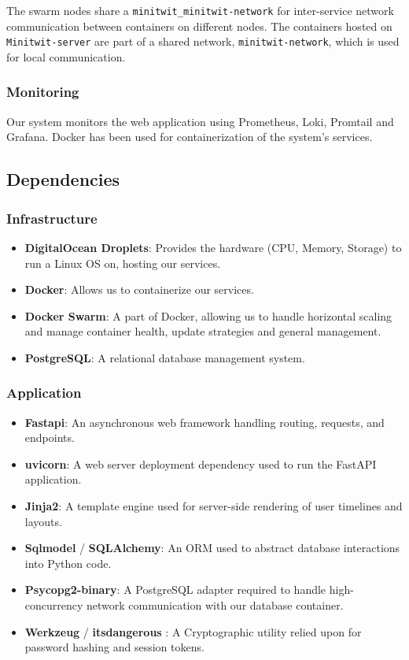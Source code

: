 \noindent The swarm nodes share a \texttt{minitwit\_minitwit-network} for inter-service network communication between containers on different nodes. The containers hosted on \texttt{Minitwit-server} are part of a shared network, \texttt{minitwit-network}, which is used for local communication.
\subsubsection{Monitoring}
Our system monitors the web application using Prometheus, Loki, Promtail and Grafana. Docker has been used for containerization of the system's services.\newline 

\subsection{Dependencies}
\subsubsection{Infrastructure}
\begin{itemize}
    \item \textbf{DigitalOcean Droplets}: Provides the hardware (CPU, Memory, Storage) to run a Linux OS on, hosting our services.
    \item \textbf{Docker}: Allows us to containerize our services.
    \item \textbf{Docker Swarm}: A part of Docker, allowing us to handle horizontal scaling and manage container health, update strategies and general management.
    \item \textbf{PostgreSQL}: A relational database management system.
\end{itemize}

\subsubsection{Application}
\begin{itemize} 
	\item \textbf{Fastapi}: An asynchronous web framework handling routing, requests, and endpoints. 
	\item \textbf{uvicorn}: A web server deployment dependency used to run the FastAPI application.
	\item \textbf{Jinja2}: A template engine used for server-side rendering of user timelines and layouts. 
	\item \textbf{Sqlmodel} / \textbf{SQLAlchemy}: An ORM used to abstract database interactions into Python code. 
	\item \textbf{Psycopg2-binary}: A PostgreSQL  adapter required to handle high-concurrency network communication with our database container. 
	\item \textbf{Werkzeug} / \textbf{itsdangerous} : A Cryptographic utility relied upon for password hashing and session tokens. 
\end{itemize}

